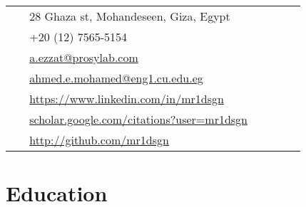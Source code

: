 \documentclass[10pt]{article} %
\begin{document}
\begin{paracol}{2}
\parbox[top][0.12\textheight][c]{\linewidth}{ %
	\vspace{-0.04\textheight} %
	\colorbox{shade}{ %
		\begin{supertabular}{p{0.05\linewidth}|p{0.775\linewidth}} %
			\raisebox{-1pt}{\faHome} & 28 Ghaza st, Mohandeseen, Giza, Egypt \\ %
			\raisebox{-1pt}{\faPhone} & +20 (12) 7565-5154 \\ %
			\raisebox{0pt}{\small\faEnvelope} & \href{mailto:a.ezzat@prosylab.com}{a.ezzat@prosylab.com} \\ %
			\raisebox{0pt}{\small\faEnvelope} & \href{ahmed.e.mohamed@eng1.cu.edu.eg}{ahmed.e.mohamed@eng1.cu.edu.eg} \\ %
			\raisebox{-1pt}{\small\faDesktop} & \href{https://www.linkedin.com/in/mr1dsgn/}{https://www.linkedin.com/in/mr1dsgn} \\ %
			\raisebox{-1pt}{\small\faDesktop} & \href{https://scholar.google.com/citations?user=mr1dsgn}{scholar.google.com/citations?user=mr1dsgn} \\ %
						\raisebox{-1pt}{\small\faDesktop} & \href{http://github.com/mr1dsgn}{http://github.com/mr1dsgn} \\ %

		\end{supertabular}
	}
}


\section{Education} 


\end{paracol}
\end{document}
